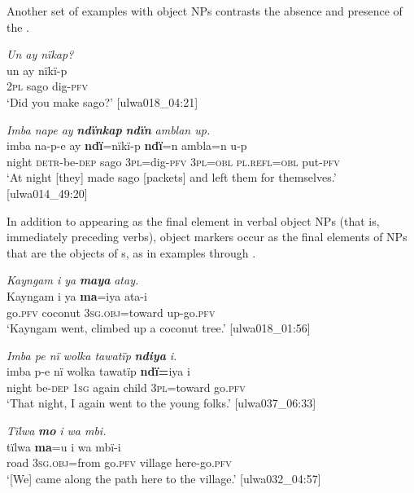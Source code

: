 Another set of examples with  object NPs contrasts the absence  and presence  of the .

\ea%
    \label{ex:det:50}
          \textit{Un ay nïkap?}\\
\gll    un  ay    nïkï-p\\
    2\textsc{pl}  sago  dig{}-\textsc{pfv}\\
\glt    ‘Did you make sago?’ [ulwa018\_04:21]
\z

\ea%
    \label{ex:det:51}
          \textit{Imba nape ay} \textbf{\textit{ndïnkap}} \textbf{\textit{ndïn}} \textit{amblan up.}\\
\gll    imba  na-p-e      ay    \textbf{ndï}=nïkï-p    \textbf{ndï}=n    ambla=n u-p\\
    night  \textsc{detr-}be\textsc{{}-dep} sago  3\textsc{pl}=dig{}-\textsc{pfv}  3\textsc{pl=obl}  \textsc{pl.refl=obl}    put-\textsc{pfv}\\
\glt `At night [they] made sago [packets] and left them for themselves.’ [ulwa014\_49:20]
\z


In addition to appearing as the final element in verbal object NPs (that is, immediately preceding verbs), object markers occur as the final elements of NPs that are the objects of s, as in examples  through .

\ea%
    \label{ex:det:52}
          \textit{Kayngam i ya} \textbf{\textit{maya}} \textit{atay.}\\
\gll    Kayngam  i    ya      \textbf{ma}=iya      ata-i\\
    [name]    go.\textsc{pfv}  coconut  3\textsc{sg.obj}=toward  up-go.\textsc{pfv}\\
\glt `Kayngam went, climbed up a coconut tree.’ [ulwa018\_01:56]
\z

\ea%
    \label{ex:det:53}
\textit{Imba pe nï wolka tawatïp} \textbf{\textit{ndiya}} \textit{i.}\\
\gll    imba  p-e    nï    wolka  tawatïp  \textbf{ndï=}iya    i\\
    night  be-\textsc{dep}  \textsc{1sg} again  child  3\textsc{pl=}toward  go.\textsc{pfv}\\
\glt `That night, I again went to the young folks.’ [ulwa037\_06:33]
\z

\ea%
    \label{ex:det:54}
          \textit{Tïlwa} \textbf{\textit{mo}} \textit{i wa mbi.}\\
\gll    tïlwa  \textbf{ma}=u      i    wa    mbï-i\\
    road  3\textsc{sg.obj}=from  go.\textsc{pfv}  village  here-go.\textsc{pfv}\\
\glt `[We] came along the path here to the village.’ [ulwa032\_04:57]
\z

